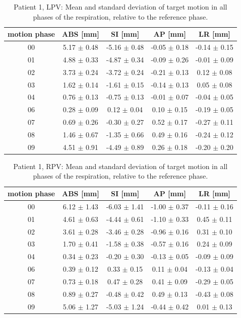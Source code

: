 \documentclass[type=dr, dr=rernat, accentcolor=tud7b,colorbacktitle, bigchapter, openright, twoside, 12pt ]{tudthesis}
\begin{document}
\begin{table}[H]
  \centering
  \caption{Patient 1, LPV: Mean and standard deviation of target motion in all phases of the respiration, relative to the reference phase.}
  \begin{tabular}{|c|c|c|c|c|}
    \hline\hline
    motion phase & ABS [mm] & SI [mm] & AP [mm] & LR [mm]\\
    \hline 
    00& 5.17 $\pm$ 0.48& -5.16 $\pm$ 0.48& -0.05 $\pm$ 0.18& -0.14 $\pm$ 0.15 \\
01& 4.88 $\pm$ 0.33& -4.87 $\pm$ 0.34& -0.09 $\pm$ 0.26& -0.01 $\pm$ 0.09 \\
02& 3.73 $\pm$ 0.24& -3.72 $\pm$ 0.24& -0.21 $\pm$ 0.13& 0.12 $\pm$ 0.08 \\
03& 1.62 $\pm$ 0.14& -1.61 $\pm$ 0.15& -0.14 $\pm$ 0.13& 0.05 $\pm$ 0.08 \\
04& 0.76 $\pm$ 0.13& -0.75 $\pm$ 0.13& -0.01 $\pm$ 0.07& -0.04 $\pm$ 0.05 \\
06& 0.28 $\pm$ 0.09& 0.12 $\pm$ 0.04& 0.10 $\pm$ 0.15& -0.19 $\pm$ 0.05 \\
07& 0.69 $\pm$ 0.26& -0.30 $\pm$ 0.27& 0.52 $\pm$ 0.17& -0.27 $\pm$ 0.11 \\
08& 1.46 $\pm$ 0.67& -1.35 $\pm$ 0.66& 0.49 $\pm$ 0.16& -0.24 $\pm$ 0.12 \\
09& 4.51 $\pm$ 0.91& -4.49 $\pm$ 0.89& 0.26 $\pm$ 0.18& -0.20 $\pm$ 0.20 \\
        \hline\hline
  \end{tabular}
\end{table}

\begin{table}[H]
  \centering
  \caption{Patient 1, RPV: Mean and standard deviation of target motion in all phases of the respiration, relative to the reference phase.}
  \begin{tabular}{|c|c|c|c|c|}
    \hline\hline
    motion phase & ABS [mm] & SI [mm] & AP [mm] & LR [mm]\\
    \hline 
00& 6.12 $\pm$ 1.43& -6.03 $\pm$ 1.41& -1.00 $\pm$ 0.37& -0.11 $\pm$ 0.16 \\
01& 4.61 $\pm$ 0.63& -4.44 $\pm$ 0.61& -1.10 $\pm$ 0.33& 0.45 $\pm$ 0.11 \\
02& 3.61 $\pm$ 0.28& -3.46 $\pm$ 0.28& -0.96 $\pm$ 0.16& 0.31 $\pm$ 0.10 \\
03& 1.70 $\pm$ 0.41& -1.58 $\pm$ 0.38& -0.57 $\pm$ 0.16& 0.24 $\pm$ 0.09 \\
04& 0.34 $\pm$ 0.23& -0.20 $\pm$ 0.30& -0.13 $\pm$ 0.05& -0.09 $\pm$ 0.09 \\
06& 0.39 $\pm$ 0.12& 0.33 $\pm$ 0.15& 0.11 $\pm$ 0.04& -0.13 $\pm$ 0.04 \\
07& 0.73 $\pm$ 0.18& 0.47 $\pm$ 0.28& 0.41 $\pm$ 0.09& -0.29 $\pm$ 0.05 \\
08& 0.89 $\pm$ 0.27& -0.48 $\pm$ 0.42& 0.49 $\pm$ 0.13& -0.43 $\pm$ 0.08 \\
09& 5.06 $\pm$ 1.27& -5.03 $\pm$ 1.24& -0.44 $\pm$ 0.42& 0.01 $\pm$ 0.13 \\
        \hline\hline
  \end{tabular}
\end{table}
\end{document}
